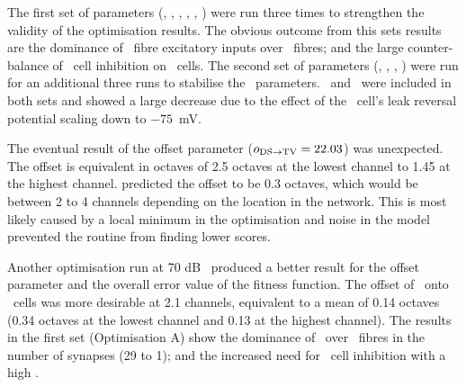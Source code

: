 The first set of parameters (\nDSTV, \wDSTV, \nLSRTV, \nHSRTV, \wLSRTV, \wHSRTV) were run three times to strengthen the validity of the optimisation results.
The obvious outcome from this sets results are the dominance of \LSR~fibre excitatory inputs over \HSR~fibres; and the large counter-balance of \DS~cell inhibition on \TV~cells.
The second set of parameters (\sDSTV, \Eleak \oDSTV, \nDSTV, \wDSTV) were run for an additional three runs to stabilise the \DSTV~parameters.
\nDSTV~and \wDSTV~were included in both sets and showed a large decrease due to the effect of the \TV~cell's leak reversal potential \Eleak scaling down to $-75$~mV\@.


The eventual result of the offset parameter ($\protect o_{\protect\textrm{{DS}}\to\textrm{{TV}}} = 22.03$) was unexpected.
The offset is equivalent in octaves of 2.5 octaves at the lowest channel to 1.45 at the highest channel.
\citet{ReissYoung:2005} predicted the offset to be 0.3 octaves, which would be between 2 to 4 channels depending on the location in the network.
This is most likely caused by a local minimum in the optimisation and noise in the model prevented the routine from finding lower scores.


Another optimisation run at 70 dB \SPL~produced a better result for the offset parameter and the overall error value of the fitness function.
The offset of \DS~onto \TV~cells was more desirable at 2.1 channels, equivalent to a mean of 0.14 octaves (0.34 octaves at the lowest channel and 0.13 at the highest channel).
The results in the first set (Optimisation A) show the dominance of \LSR~over \HSR~fibres in the number of synapses (29 to 1); and the increased need for \DS~cell inhibition with a high \nDSTV.

